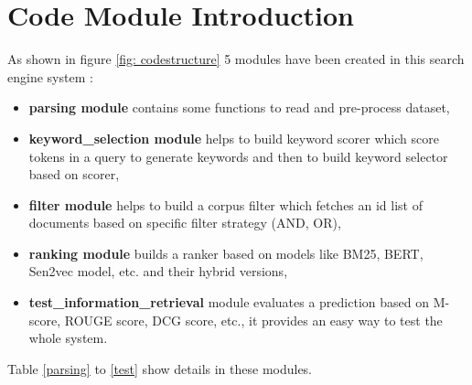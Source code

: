 \documentclass[10pt,a4paper,fleqn]{report}
\begin{document}
	\section{Code Module Introduction}	%
	
	As shown in figure \ref{fig: codestructure} 5 modules have been created in this search engine system :
	\begin{itemize}
		\item \textbf{parsing module} contains some functions to read and pre-process dataset,
		\item \textbf{keyword\_selection module} helps to build keyword scorer which score tokens in a query to generate keywords and then to build keyword selector based on scorer, 
		\item \textbf{filter module} helps to build a corpus filter which fetches an id list of documents based on specific filter strategy (AND, OR), 
		\item \textbf{ranking module} builds a ranker based on models like BM25, BERT, Sen2vec model, etc. and their hybrid versions, 
		\item \textbf{test\_information\_retrieval} module evaluates a prediction based on M-score, ROUGE score, DCG score, etc., it provides an easy way to test the whole system.     		
	\end{itemize}
	Table \ref{parsing} to \ref{test} show details in these modules.
	
	\begin{table}[htbp] 			
		\caption{\label{parsing}parsing} 
	\end{table}
	
\end{document}
